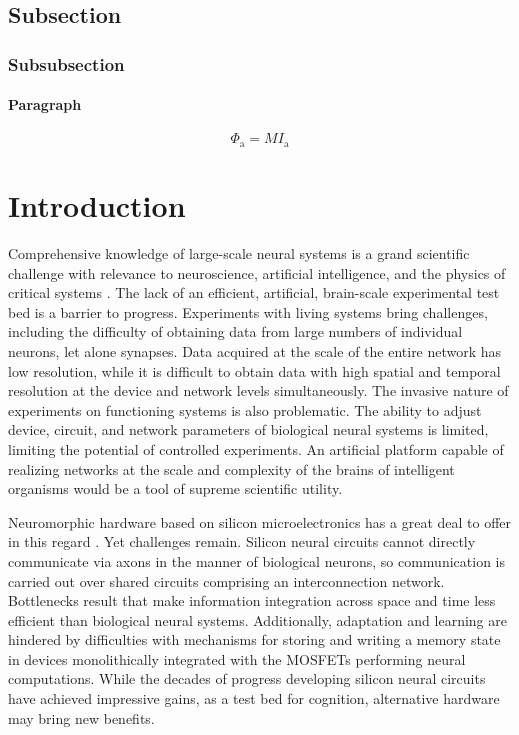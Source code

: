 \documentclass[twocolumn]{article}
\begin{document}
\subsection{Subsection}
\subsubsection{Subsubsection}
\paragraph{Paragraph}

\begin{equation}
\Phi_{\mathrm{a}} = M I_{\mathrm{a}}
\end{equation}

\section{\label{sec:introduction}Introduction}

Comprehensive knowledge of large-scale neural systems is a grand scientific challenge with relevance to neuroscience, artificial intelligence, and the physics of critical systems \cite{elst2012,ized2008,br2017,fama2019,eide2019}. The lack of an efficient, artificial, brain-scale experimental test bed is a barrier to progress. Experiments with living systems bring challenges, including the difficulty of obtaining data from large numbers of individual neurons, let alone synapses. Data acquired at the scale of the entire network has low resolution, while it is difficult to obtain data with high spatial and temporal resolution at the device and network levels simultaneously. The invasive nature of experiments on functioning systems is also problematic. The ability to adjust device, circuit, and network parameters of biological neural systems is limited, limiting the potential of controlled experiments. An artificial platform capable of realizing networks at the scale and complexity of the brains of intelligent organisms would be a tool of supreme scientific utility.

Neuromorphic hardware based on silicon microelectronics has a great deal to offer in this regard \cite{me1989,lide2015,chba2003,inch2006,voma2007,inli2011,cryu2012,cage2013,pfgr2013,bega2014,fu2016,moqi2018}. Yet challenges remain. Silicon neural circuits cannot directly communicate via axons in the manner of biological neurons, so communication is carried out over shared circuits comprising an interconnection network. Bottlenecks result that make information integration across space and time less efficient than biological neural systems. Additionally, adaptation and learning are hindered by difficulties with mechanisms for storing and writing a memory state in devices monolithically integrated with the MOSFETs performing neural computations. While the decades of progress developing silicon neural circuits have achieved impressive gains, as a test bed for cognition, alternative hardware may bring new benefits.
\end{document}
